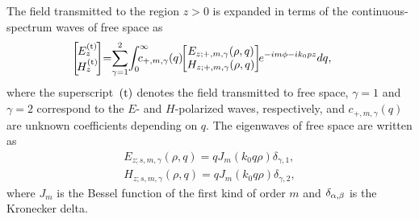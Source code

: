 \documentclass[summary]{URSIGASS2020}
\def\f{\phi}
\begin{document}
The field transmitted to the region $ z>0 $ is expanded in terms of the continuous-spectrum waves of free space as
\begin{align}\label{eq7}
&\hspace{-2mm}\left[\!\!\!\!
\begin{array}{c}
{E_z^{(\rm t)}}\\
{H_z^{(\rm t)}}
\end{array}\!\!\!\!\right]\!
{=}\!\sum\limits_{\gamma=1}^{2}\!\int_{0}^{\infty}\!\!\!\!\!\!\! c_{+,m,\gamma}(q)\!\!\left[\!\!\!
\begin{array}{c}
E_{z;+,m,\gamma}(\rho,q)\\
H_{z;+,m,\gamma}(\rho,q)
\end{array}\!\!\!\right]\!\!e^{-i m\f-ik_0 p z}{d}q,
\end{align}
where the superscript~$({\rm t})$ denotes the field transmitted to free space, $\gamma=1$ and $\gamma=2$ correspond to the $E$- and $H$-polarized waves, respectively, and $ c_{+,m,\gamma}(q) $ are unknown coefficients depending on $ q $.
The eigenwaves of free space are written as
\begin{align}\label{eq8}
E_{z;s,m,\gamma}(\rho,q) {=} q J_m(k_0q \rho)\delta_{\gamma,1},\nonumber\\ H_{z;s,m,\gamma}(\rho,q) {=} q J_m(k_0q \rho)\delta_{\gamma,2},
\end{align}
where $J_m$ is the Bessel function of the first kind of order $m$ and $\delta_{\rm
\alpha,\beta}$ is the Kronecker delta.
\end{document}
